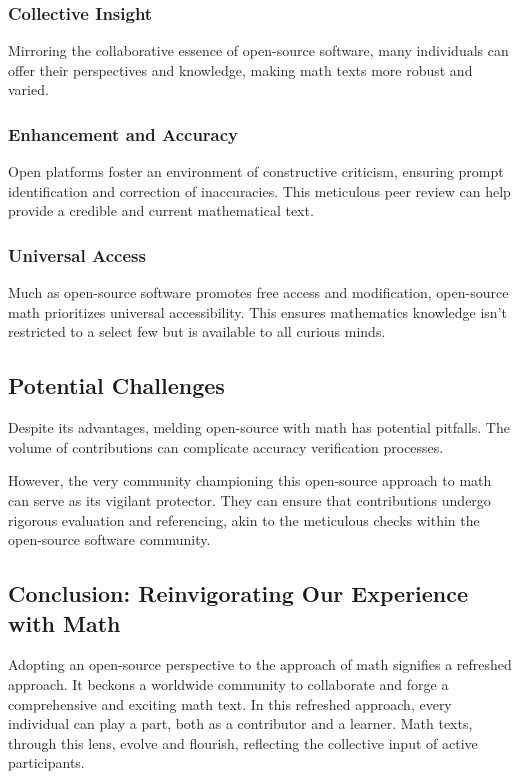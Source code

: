 \documentclass[a4paper,12pt]{book}
\begin{document}
\subsubsection*{Collective Insight}
Mirroring the collaborative essence of open-source software, many individuals can offer their perspectives and knowledge, making math texts more robust and varied.

\subsubsection*{Enhancement and Accuracy}
Open platforms foster an environment of constructive criticism, ensuring prompt identification and correction of inaccuracies. This meticulous peer review can help provide a credible and current mathematical text.

\subsubsection*{Universal Access}
Much as open-source software promotes free access and modification, open-source math prioritizes universal accessibility. This ensures mathematics knowledge isn't restricted to a select few but is available to all curious minds.

\subsection*{Potential Challenges}
Despite its advantages, melding open-source with math has potential pitfalls. The volume of contributions can complicate accuracy verification processes. 

However, the very community championing this open-source approach to math can serve as its vigilant protector. They can ensure that contributions undergo rigorous evaluation and referencing, akin to the meticulous checks within the open-source software community.

\subsection*{Conclusion: Reinvigorating Our Experience with Math}
Adopting an open-source perspective to the approach of math signifies a refreshed approach. It beckons a worldwide community to collaborate and forge a comprehensive and exciting math text. In this refreshed approach, every individual can play a part, both as a contributor and a learner. Math texts, through this lens, evolve and flourish, reflecting the collective input of active participants.
\end{document}
